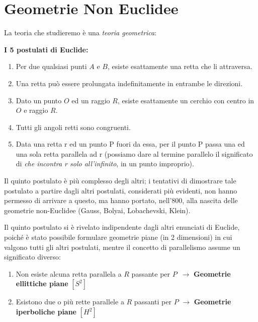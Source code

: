 \chapter{Geometrie Non Euclidee}

La teoria che studieremo è una \textit{teoria geometrica}:

\textbf{I 5 postulati di Euclide:}
\begin{enumerate}
    \item Per due qualsiasi punti $A$ e $B$, esiste esattamente una retta che li attraversa.
    \item Una retta può essere prolungata indefinitamente in entrambe le direzioni.
    \item Dato un punto $O$ ed un raggio $R$, esiste esattamente un cerchio con centro in $O$ e raggio $R$.
    \item Tutti gli angoli retti sono congruenti.
    \item Data una retta r ed un punto P fuori da essa, per
    il punto P passa una ed una sola retta parallela ad r (possiamo dare al termine parallelo il significato di \textit{che incontra r solo all'infinito}, in un punto improprio).
\end{enumerate}

Il quinto postulato è più complesso degli altri; i tentativi di dimostrare tale postulato a partire dagli altri postulati, considerati più evidenti, non hanno permesso di arrivare a questo, ma hanno portato, nell'800, alla nascita delle geometrie non-Euclidee (Gauss, Bolyai, Lobachevski, Klein).

\begin{center}
\end{center}

Il quinto postulato si è rivelato indipendente dagli altri enunciati di Euclide, poiché è stato possibile formulare geometrie piane (in 2 dimensioni) in cui valgono tutti gli altri postulati, mentre il concetto di parallelismo assume un significato diverso:

\begin{enumerate}
    \item Non esiste alcuna retta parallela a $R$ passante per $P$ \,\quad $\rightarrow$ \textbf{Geometrie ellittiche piane} $[S^2]$
    \item Esistono due o più rette parallele a $R$ passanti per $P$ \quad $\rightarrow$ \textbf{Geometrie iperboliche piane} $[H^2]$
\end{enumerate}


